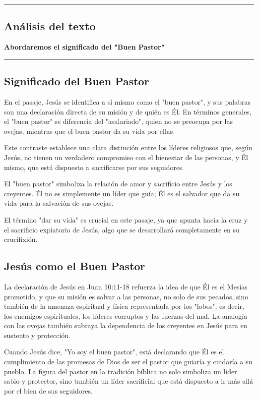 {\color{gray}\hrule}
\begin{center}
\section{Análisis del texto}
\textbf{Abordaremos el significado del "Buen Pastor"}
\end{center}
{\color{gray}\hrule}

\begin{multicols}{2}


\subsection{Significado del Buen Pastor}

  En el pasaje, Jesús se identifica a sí mismo como el "buen pastor", y sus palabras son una declaración directa de su misión y de quién es Él. 
  En términos generales, el "buen pastor" se diferencia del "asalariado", quien no se preocupa por las ovejas, mientras que el buen pastor da su vida por ellas. 

  Este contraste establece una clara distinción entre los líderes religiosos que, según Jesús, no tienen un verdadero compromiso con el bienestar de las personas, 
  y Él mismo, que está dispuesto a sacrificarse por sus seguidores.

  El "buen pastor" simboliza la relación de amor y sacrificio entre Jesús y los creyentes. 
  Él no es simplemente un líder que guía; Él es el salvador que da su vida para la salvación de sus ovejas. 

  El término "dar su vida" es crucial en este pasaje, ya que apunta hacia la cruz y el sacrificio expiatorio de Jesús, 
  algo que se desarrollará completamente en su crucifixión.

\subsection{Jesús como el Buen Pastor}

  La declaración de Jesús en Juan 10:11-18 refuerza la idea de que Él es el Mesías prometido, y que su misión es salvar a las personas, 
  no solo de sus pecados, sino también de la amenaza espiritual y física representada por los "lobos", es decir, los enemigos espirituales, 
  los líderes corruptos y las fuerzas del mal. La analogía con las ovejas también subraya la dependencia de los creyentes en Jesús para su sustento y protección.

  Cuando Jesús dice, "Yo soy el buen pastor", está declarando que Él es el cumplimiento de las promesas de Dios de ser el pastor que guiaría
  y cuidaría a su pueblo. La figura del pastor en la tradición bíblica no solo simboliza un líder sabio y protector, sino 
  también un líder sacrificial que está dispuesto a ir más allá por el bien de sus seguidores.

\end{multicols}
